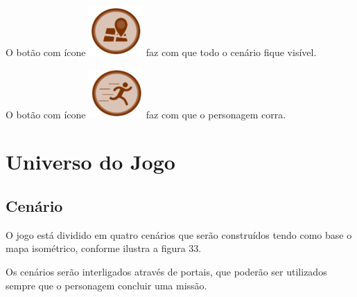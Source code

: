 \begin{alineascomponto}
	\item O botão com ícone \includegraphics[scale=0.5]{figuras/mapa} faz com que todo o cenário fique visível.\\
	
	\item O botão com ícone \includegraphics[scale=0.5]{figuras/homen} faz com que o personagem corra.
	
\end{alineascomponto}

\section {Universo do Jogo}
\label{ap:universo-do-jogo}

\subsection {Cenário}

O jogo está dividido em quatro cenários que serão construídos tendo como base o mapa isométrico, conforme ilustra a figura 33.



\begin{figure}[h!]
		\centering
	\end{figure}

Os cenários serão interligados através de portais, que poderão ser utilizados sempre que o personagem concluir uma missão.


